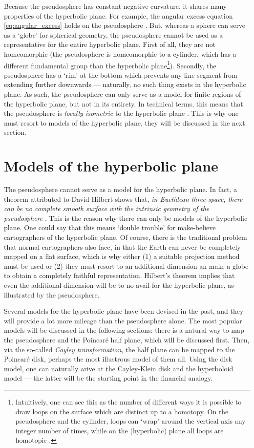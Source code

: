 Because the pseudosphere has constant negative curvature, it shares many properties of the hyperbolic plane. For example, the angular excess equation \cref{eq:angular_excess} holds on the pseudosphere \cite{Needham1997}. But, whereas a sphere can serve as a `globe' for spherical geometry, the pseudosphere cannot be used as a representative for the entire hyperbolic plane. First of all, they are not homeomorphic (the pseudosphere is homeomorphic to a cylinder, which has a different fundamental group than the hyperbolic plane\footnote{Intuitively, one can see this as the number of different ways it is possible to draw loops on the surface which are distinct up to a homotopy. On the pseudosphere and the cylinder, loops can `wrap' around the vertical axis any integer number of times, while on the (hyperbolic) plane all loops are homotopic \cite{Lee2000}.}). Secondly, the pseudosphere has a `rim' at the bottom which prevents any line segment from extending further downwards --- naturally, no such thing exists in the hyperbolic plane. As such, the pseudosphere can only serve as a model for finite regions of the hyperbolic plane, but not in its entirety. In technical terms, this means that the pseudosphere is \emph{locally isometric} to the hyperbolic plane \cite{Ghys2010}. This is why one must resort to models of the hyperbolic plane, they will be discussed in the next section.

\section{Models of the hyperbolic plane}
The pseudosphere cannot serve as a model for the hyperbolic plane. In fact, a theorem attributed to David Hilbert shows that, \emph{in Euclidean three-space, there can be no complete smooth surface with the intrinsic geometry of the pseudosphere} \cite{Thurston1997}. This is the reason why there can only be models of the hyperbolic plane. One could say that this means `double trouble' for make-believe cartographers of the hyperbolic plane. Of course, there is the traditional problem that normal cartographers also face, in that the Earth can never be completely mapped on a flat surface, which is why either (1) a suitable projection method must be used or (2) they must resort to an additional dimension an make a globe to obtain a completely faithful representation. Hilbert's theorem implies that even the additional dimension will be to no avail for the hyperbolic plane, as illustrated by the pseudosphere.

Several models for the hyperbolic plane have been devised in the past, and they will provide a lot more mileage than the pseudosphere alone. The most popular models will be discussed in the following sections: there is a natural way to map the pseudosphere and the Poincaré half plane, which will be discussed first. Then, via the so-called \emph{Cayley transformation}, the half plane can be mapped to the Poincaré disk, perhaps the most illustrous model of them all. Using the disk model, one can naturally arive at the Cayley-Klein disk and the hyperboloid model --- the latter will be the starting point in the financial analogy.

